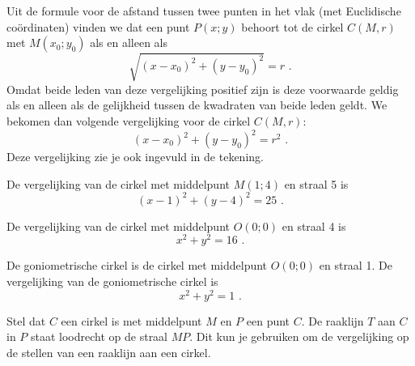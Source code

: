 Uit de formule voor de afstand tussen twee punten in het vlak (met Euclidische co\"ordinaten) vinden we dat een punt $P(x;y)$ behoort tot de cirkel $C(M,r)$ met $M(x_0;y_0)$ als en alleen als
\[
\sqrt {(x-x_0)^2+(y-y_0)^2}=r \text { .}
\]
Omdat beide leden van deze vergelijking positief zijn is deze voorwaarde geldig als en alleen als de gelijkheid tussen de kwadraten van beide leden geldt.
We bekomen dan volgende vergelijking voor de cirkel $C(M,r)$:
\[
(x-x_0)^2+(y-y_0)^2=r^2 \text { .}
\]
Deze vergelijking zie je ook ingevuld in de tekening.

\begin{voorbeeld}
	De vergelijking van de cirkel met middelpunt $M(1;4)$ en straal 5 is
\[
(x-1)^2+(y-4)^2=25 \text { .}
\]
\end{voorbeeld}
\begin{voorbeeld}
	De vergelijking van de cirkel met middelpunt $O(0;0)$ en straal 4 is
\[
x^2+y^2=16 \text { .}
\]
\end{voorbeeld}
\begin{voorbeeld}
	De goniometrische cirkel is de cirkel met middelpunt $O(0;0)$ en straal 1.
De vergelijking van de goniometrische cirkel is
\[
x^2+y^2=1 \text { .}
\]

\end{voorbeeld}

\vspace{2mm} Stel dat $C$ een cirkel is met middelpunt $M$ en $P$ een punt $C$.
De raaklijn $T$ aan $C$ in $P$ staat loodrecht op de straal $MP$.
Dit kun je gebruiken om de vergelijking op de stellen van een raaklijn aan een cirkel.

